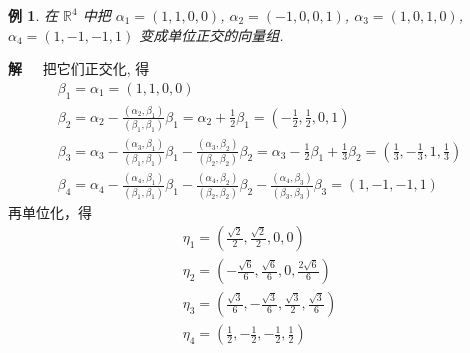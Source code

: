 \documentclass[13pt]{beamer}
\newtheorem{exa}{例}
\def\sol{{\bf 解~~ }}
\def\R{\mathbb{R}}
\begin{document}
\begin{frame}
\begin{exa}
 在 ${\R}^{4}$ 中把 $\alpha_{1}=(1,1,0,0)$, $\alpha_{2}=(-1,0,0,1)$, $\alpha_{3}=(1,0,1,0)$, $\alpha_{4}= (1,-1,-1,1)$ 变成单位正交的向量组. 
\end{exa}
\sol  把它们正交化, 得 
\[
\begin{array}{l}
\beta_{1}=\alpha_{1}=(1,1,0,0)\\
\beta_{2}=\alpha_{2}-\frac{\left(\alpha_{2}, \beta_{1}\right)}{\left(\beta_{1}, \beta_{1}\right)} \beta_{1}=\alpha_{2}+\frac{1}{2} \beta_{1}=\left(-\frac{1}{2}, \frac{1}{2}, 0,1\right) \\
\beta_{3}=\alpha_{3}-\frac{\left(\alpha_{3}, \beta_{1}\right)}{\left(\beta_{1}, \beta_{1}\right)} \beta_{1}-\frac{\left(\alpha_{3}, \beta_{2}\right)}{\left(\beta_{2}, \beta_{2}\right)} \beta_{2}=\alpha_{3}-\frac{1}{2} \beta_{1}+\frac{1}{3} \beta_{2}=\left(\frac{1}{3},-\frac{1}{3}, 1, \frac{1}{3}\right) \\
\beta_{4}=\alpha_{4}-\frac{\left(\alpha_{4}, \beta_{1}\right)}{\left(\beta_{1}, \beta_{1}\right)} \beta_{1}-\frac{\left(\alpha_{4}, \beta_{2}\right)}{\left(\beta_{2}, \beta_{2}\right)} \beta_{2}-\frac{\left(\alpha_{4}, \beta_{3}\right)}{\left(\beta_{3}, \beta_{3}\right)} \beta_{3}=(1,-1,-1,1)
\end{array}
\]
再单位化，得
\[
\begin{array}{l}
\eta_{1}=\left(\frac{\sqrt{2}}{2}, \frac{\sqrt{2}}{2}, 0,0\right)\\
\eta_{2}=\left(-\frac{\sqrt{6}}{6}, \frac{\sqrt{6}}{6}, 0, \frac{2 \sqrt{6}}{6}\right) \\
\eta_{3}=\left(\frac{\sqrt{3}}{6},-\frac{\sqrt{3}}{6}, \frac{\sqrt{3}}{2}, \frac{\sqrt{3}}{6}\right) \\
\eta_{4}=\left(\frac{1}{2},-\frac{1}{2},-\frac{1}{2}, \frac{1}{2}\right)
\end{array}
\]
\end{frame}
\end{document}
